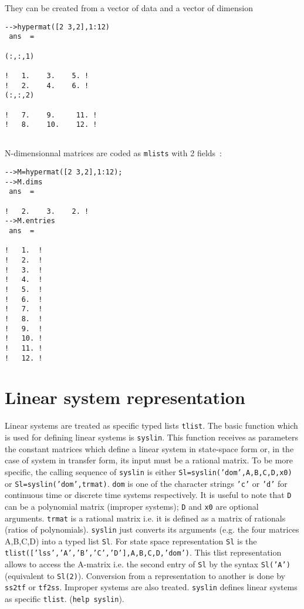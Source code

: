 They can be created from a vector of data and a vector of dimension 

\begin{verbatim}
-->hypermat([2 3,2],1:12)
 ans  =
 
(:,:,1)
 
!   1.    3.    5. !
!   2.    4.    6. !
(:,:,2)
 
!   7.    9.     11. !
!   8.    10.    12. !
 
\end{verbatim}

N-dimensionnal matrices are coded as {\tt mlists} with 2 fields~:
\begin{verbatim}
-->M=hypermat([2 3,2],1:12);
-->M.dims
 ans  =
 
!   2.    3.    2. !
-->M.entries
 ans  =
 
!   1.  !
!   2.  !
!   3.  !
!   4.  !
!   5.  !
!   6.  !
!   7.  !
!   8.  !
!   9.  !
!   10. !
!   11. !
!   12. !
\end{verbatim}

\section{Linear system representation}
Linear systems are treated as specific typed lists {\tt tlist}.
The basic function which is used for defining linear systems is {\tt syslin}.
This function receives as parameters the constant matrices which
define a linear system in state-space form or, in the case of
system in transfer form, its input must be a rational matrix.
To be more specific, the calling sequence of {\tt syslin} is
either {\tt Sl=syslin('dom',A,B,C,D,x0)} or {\tt Sl=syslin('dom',trmat)}.
{\tt dom} is one of the character strings {\tt 'c'} or {\tt 'd'}
for continuous time or discrete time systems respectively.
It is useful to note that {\tt D} can be a polynomial matrix 
(improper systems); {\tt D} and {\tt x0} are optional arguments.
{\tt trmat} is a rational matrix i.e. it is defined as a matrix
of rationals (ratios of polynomials). {\tt syslin} just converts
its arguments (e.g. the four matrices A,B,C,D) into a typed
list {\tt Sl}. For state space representation {\tt Sl} is 
the {\tt tlist(['lss','A','B','C','D'],A,B,C,D,'dom')}. This tlist
representation allows to access the A-matrix i.e. the second entry of
{\tt Sl} by the syntax {\tt Sl('A')} (equivalent to {\tt Sl(2)}).
Conversion from a representation to another is done by {\tt ss2tf}
or {\tt tf2ss}. Improper systems are also treated. {\tt syslin} 
defines linear systems as specific {\tt tlist}. ({\tt help syslin}).

